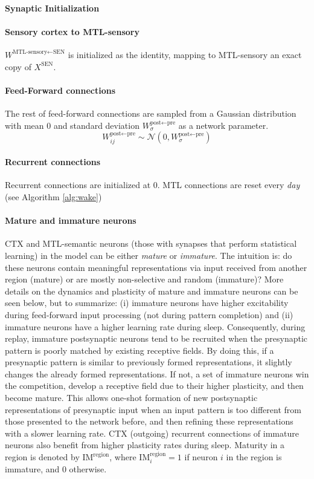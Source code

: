 \documentclass{article}
\begin{document}
\paragraph{Synaptic Initialization}
\paragraph{Sensory cortex to MTL-sensory}
$W^{\textrm{MTL-sensory}\leftarrow\textrm{SEN}}$ is initialized as the identity, mapping to MTL-sensory an exact copy of $X^\textrm{SEN}$.
\paragraph{Feed-Forward connections}
The rest of feed-forward connections are sampled from a Gaussian distribution with mean 0 and standard deviation $W^{\textrm{post}\leftarrow\textrm{pre}}_\sigma$ as a network parameter.
\begin{equation}
    W^{\textrm{post}\leftarrow\textrm{pre}}_{ij} \sim \mathcal{N}(0, W^{\textrm{post}\leftarrow\textrm{pre}}_\sigma)
\end{equation}
\paragraph{Recurrent connections}
Recurrent connections are initialized at 0. MTL connections are reset every \textit{day} (see Algorithm \ref{alg:wake})
\paragraph{Mature and immature neurons} CTX and MTL-semantic neurons (those with synapses that perform statistical learning) in the model can be either \textit{mature} or \textit{immature}. The intuition is: do these neurons contain meaningful representations via input received from another region (mature) or are mostly non-selective and random (immature)? More details on the dynamics and plasticity of mature and immature neurons can be seen below, but to summarize: (i) immature neurons have higher excitability during feed-forward input processing (not during pattern completion) and (ii) immature neurons have a higher learning rate during sleep. Consequently, during replay, immature postsynaptic neurons tend to be recruited when the presynaptic pattern is poorly matched by existing receptive fields. By doing this, if a presynaptic pattern is similar to previously formed representations, it slightly changes the already formed representations. If not, a set of immature neurons win the competition, develop a receptive field due to their higher plasticity, and then become mature. This allows one-shot formation of new postsynaptic representations of presynaptic input when an input pattern is too different from those presented to the network before, and then refining these representations with a slower learning rate. CTX (outgoing) recurrent connections of immature neurons also benefit from higher plasticity rates during sleep. Maturity in a region is denoted by $\textrm{IM}^\textrm{region}$, where $\textrm{IM}^\textrm{region}_i = 1$ if neuron $i$ in the region is immature, and 0 otherwise.
\end{document}
